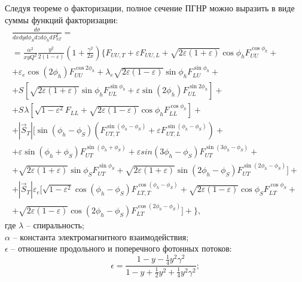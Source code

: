 \documentclass{extarticle}
\begin{document}
Следуя теореме о факторизации, полное сечение ПГНР можно выразить в виде суммы функций факторизации:
\begin{multline} 
	\label{sigma}
	\frac{d\sigma}{dx dy d \phi_S dz d \phi_{h} dP^{2}_{h T}} = \\
	= \frac{\alpha^2}{xy Q^{2}} \frac{y^2}{2 (1 - \varepsilon)} \left(1 + \frac{\gamma^2}{2x} \right)
	\Biggl \lbrace F_{U U, T} +
	\varepsilon F_{U U, L} +
	\sqrt{2 \varepsilon (1 + \varepsilon)} \cos \phi_h F_{UU}^{\cos \phi_h} + \\
	+ \varepsilon_e \cos(2\phi_h) F_{U U}^{\cos 2\phi_h} +
	\lambda_e \sqrt{2 \varepsilon (1 - \varepsilon)} \sin \phi_h F_{L U}^{\sin \phi_h} + \\
	+ S_{} \left [ \sqrt{2 \varepsilon (1 + \varepsilon)} \sin \phi_h F_{UL}^{\sin \phi_h} +
	\varepsilon \sin(2\phi_h) F_{UL}^{\sin 2\phi_h} \right] + \\
	+ S_{} \lambda \left [ \sqrt{1 - \varepsilon^2} F_{L L} +
	\sqrt{2 \varepsilon (1 - \varepsilon)} \cos \phi_h F_{LL}^{\cos \phi_h} \right] + \\
	+ |\vec S_{T}| \Biggl[ \sin(\phi_h - \phi_S) \left(F_{U T, T}^{\sin(\phi_h - \phi_S)} +
	\varepsilon F_{UT, L}^{\sin(\phi_h - \phi_S)} \right) + \\
	+ \varepsilon \sin(\phi_h + \phi_S) F_{U T}^{\sin (\phi_h + \phi_S)} +
	\varepsilon sin (3\phi_h - \phi_S) F_{UT}^{\sin (3\phi_h - \phi_S)} + \\
	+ \sqrt{2 \varepsilon (1 + \varepsilon)} \sin \phi_S F_{UT}^{\sin \phi_S} +
	\sqrt{2 \varepsilon (1 + \varepsilon)} \sin(2\phi_h - \phi_S) F_{UT}^{\sin(2\phi_h - \phi_S)}  \Biggr] + \\
	+ |\vec S_{T}| \varepsilon_e \Biggl[ \sqrt{1 - \varepsilon^2} \cos(\phi_h - \phi_S) F_{LT, T}^{\cos(\phi_h - \phi_S)} +
	\sqrt{2 \varepsilon (1 - \varepsilon)} \cos \phi_S F_{LT}^{\cos \phi_S} + \\
	+ \sqrt{2 \varepsilon (1 - \varepsilon)} \cos(2\phi_h - \phi_S) F_{LT}^{\cos(2\phi_h - \phi_S)}  \Biggr] + \Biggr \rbrace,
\end{multline}
где $\lambda$ -- спиральность; \\
$\alpha$ -- константа электромагнитного взаимодействия; \\
 $\epsilon$ -- отношение продольного и поперечного фотонных потоков:
\begin{equation}
	\epsilon = \frac{1-y-\frac{1}{4}y^2\gamma^2}{1-y+\frac{1}{2} y^2 +\frac{1}{4}y^2\gamma^2};
\end{equation}
\\
\end{document}
